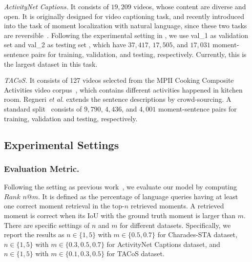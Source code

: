 \documentclass[letterpaper]{article} %
\begin{document}
\textit{ActivityNet Captions.} It consists of $19,209$  videos, whose content are diverse and open.
It is originally designed for video captioning task, and recently introduced into the task of moment localization with natural language, since these two tasks are reversible~\cite{chen2018temporally,zhang2019cross}.
Following the experimental setting in \cite{zhang2019cross}, we use val\_1 as validation set and val\_2 as testing set , which have $37,417$, $17,505$, and $17,031$ moment-sentence pairs for training, validation, and testing, respectively. Currently, this is the largest dataset in this task.

\textit{TACoS.}
It consists of 127 videos selected from the MPII Cooking Composite Activities video corpus~\cite{rohrbach2012script}, which contains different activities happened in kitchen room.
Regneri \textit{et al.} extends the sentence descriptions by crowd-sourcing.
A standard split~\cite{gao2017tall} consists of $9,790$, $4,436$, and $4,001$ moment-sentence pairs for training, validation and testing, respectively.

\subsection{Experimental Settings}

\subsubsection{Evaluation Metric.}
Following the setting as previous work~\cite{gao2017tall}, we evaluate our model by computing $Rank$ $n$@$m$. It is defined as the percentage of language queries having at least one correct moment retrieval in the top-$n$ retrieved moments. A retrieved moment is correct when its IoU with the ground truth moment is larger than $m$. 
There are specific settings of $n$ and $m$ for different datasets. Specifically,
we report the results as $n\in\{1, 5\}$ with $m\in\{0.5,0.7\}$ for Charades-STA dataset, $n\in\{1, 5\}$ with $m\in\{0.3,0.5,0.7\}$ for ActivityNet Captions dataset, and $n\in\{1, 5\}$ with $m\in\{0.1,0.3,0.5\}$ for TACoS dataset.
\end{document}
